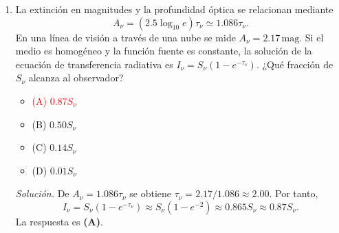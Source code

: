 \documentclass[11pt]{article}
\begin{document}
\begin{enumerate}
    \item La extinción en magnitudes y la profundidad óptica se relacionan mediante
    \[
        A_\nu=(2.5\log_{10}e)\tau_\nu\simeq1.086\tau_\nu.
    \]
    En una línea de visión a través de una nube se mide $A_\nu=2.17\,\mathrm{mag}$. Si el medio es homogéneo y la función fuente es constante, la solución de la ecuación de transferencia radiativa es $I_\nu=S_\nu(1-e^{-\tau_\nu})$. ¿Qué fracción de $S_\nu$ alcanza al observador?
    \begin{itemize}
        \item \textcolor{red}{(A) $0.87S_\nu$}
        \item (B) $0.50S_\nu$
        \item (C) $0.14S_\nu$
        \item (D) $0.01S_\nu$
    \end{itemize}
    \textit{Solución.} De $A_\nu=1.086\tau_\nu$ se obtiene $\tau_\nu=2.17/1.086\approx2.00$. Por tanto,
    \[
        I_\nu=S_\nu(1-e^{-\tau_\nu})\approx S_\nu(1-e^{-2})\approx0.865S_\nu\approx0.87S_\nu.
    \]
    La respuesta es \textbf{(A)}. \parencite[Secs. 13.3.1--13.3.2 y 13.7, pp. 394--395, 403--405]{chaparro2026}
\end{enumerate}
\end{document}
